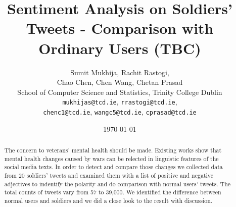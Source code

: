 \documentclass[english,a4paper,11pt]{article}
\title{Sentiment Analysis on Soldiers' Tweets - Comparison with Ordinary Users (TBC)}
\date{\today}
\author{
  Sumit Mukhija, Rachit Rastogi,\\
  Chao Chen, Chen Wang, Chetan Prasad\\
  School of Computer Science and Statistics, Trinity College Dublin\\
  \texttt{mukhijas@tcd.ie}, \texttt{rrastogi@tcd.ie},\\
  \texttt{chenc1@tcd.ie}, \texttt{wangc5@tcd.ie}, \texttt{cprasad@tcd.ie}
}
\begin{document}
\maketitle
\thispagestyle{empty}
\pagestyle{empty}

\begin{abstract}
The concern to veterans' mental health should be made. Existing works show that
mental health changes caused by wars can be relected in linguistic features of
the social media texts. In order to detect and compare those changes we collected
data from 20 soldiers' tweets and examined them with a list of positive and negative
adjectives to indentify the polarity and do comparison with normal users'
tweets. The total counts of tweets vary from 57 to 39,000. We identified the
difference between normal users and soldiers and we did a close look to the
result with discussion.
\end{abstract}









\printbibliography
\end{document}
